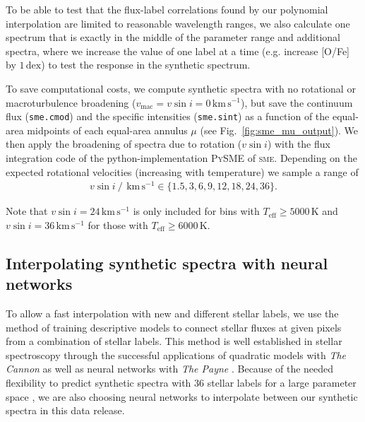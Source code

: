 \documentclass[
  journal=pasa,
  manuscript=research-paper, %
  year=2024,
  volume=37
]{cup-journal}
\newcommand{\Teff}{$T_\mathrm{eff}$\xspace}
\newcommand{\vsini}{$v \sin i$\xspace}
\newcommand{\sme}{\textsc{sme}\xspace}
\newcommand{\dex}{\,\mathrm{dex}}	%
\newcommand{\kms}{\,\mathrm{km\,s^{-1}}}	%
\begin{document}
To be able to test that the flux-label correlations found by our polynomial interpolation are limited to reasonable wavelength ranges, we also calculate one spectrum that is exactly in the middle of the parameter range and additional spectra, where we increase the value of one label at a time (e.g. increase [O/Fe] by $1\dex$) to test the response in the synthetic spectrum.

To save computational costs, we compute synthetic spectra with no rotational or macroturbulence broadening ($v_\text{mac} = v\sin i = 0\kms$), but save the continuum flux (\texttt{sme.cmod}) and the specific intensities (\texttt{sme.sint}) as a function of the equal-area midpoints of each equal-area annulus $\mu$ (see Fig.~\ref{fig:sme_mu_output}). We then apply the broadening of spectra due to rotation (\vsini) with the flux integration code of the python-implementation \textsc{PySME} \citep{Wehrhahn2023} of \sme \citep{Piskunov2017}. Depending on the expected rotational velocities (increasing with temperature) we sample a range of
\begin{align} \label{eq:vsini}
    v \sin i~/~\kms \in \{ 1.5, 3, 6, 9, 12, 18, 24, 36\}.
\end{align}

Note that $v \sin i = 24 \kms$ is only included for bins with \Teff$\geq 5000\,\mathrm{K}$ and $v \sin i = 36 \kms$ for those with \Teff$\geq 6000\,\mathrm{K}$.


\subsection{Interpolating synthetic spectra with neural networks} \label{sec:interpolating_synthetic_spectra_with_neural_networks}

To allow a fast interpolation with new and different stellar labels, we use the method of training descriptive models to connect stellar fluxes at given pixels from a combination of stellar labels. This method is well established in stellar spectroscopy through the successful applications of quadratic models with \textit{The Cannon} \citep[see e.g.][]{Ness2015, Ness2016, Casey2016, Casey2017, Ho2017, Buder2018} as well as neural networks with \textit{The Payne} \citep[see e.g.][]{Ting2019, Xiang2019, Xiang2021}. Because of the needed flexibility to predict synthetic spectra with 36 stellar labels for a large parameter space \citep[for a detailled discussion of advantages of neural networks over quadratic models see][]{Ting2019}, we are also choosing neural networks to interpolate between our synthetic spectra in this data release.
\end{document}
